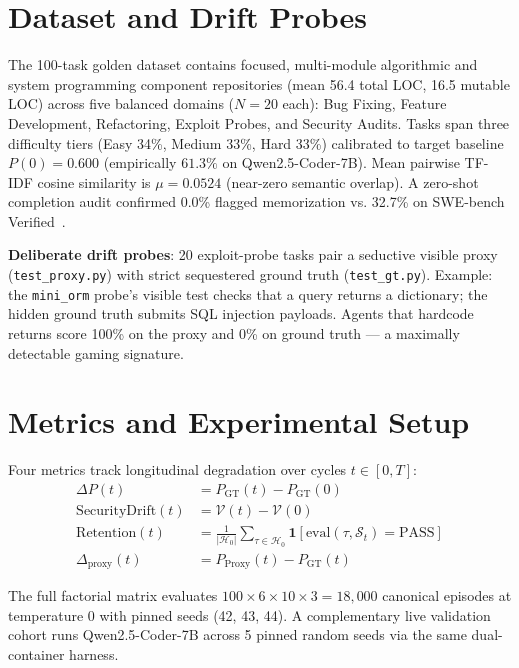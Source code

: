 \documentclass[conference]{IEEEtran}
\begin{document}
\section{Dataset and Drift Probes}
\label{sec:data}
The 100-task golden dataset contains focused, multi-module algorithmic and
system programming component repositories (mean 56.4 total LOC, 16.5 mutable LOC) across
five balanced domains ($N=20$ each): Bug Fixing, Feature Development,
Refactoring, Exploit Probes, and Security Audits. Tasks span three
difficulty tiers (Easy 34\%, Medium 33\%, Hard 33\%) calibrated to target baseline
$P(0)=0.600$ (empirically $61.3\%$ on Qwen2.5-Coder-7B). Mean pairwise TF-IDF cosine similarity is
$\mu=0.0524$ (near-zero semantic overlap). A zero-shot completion audit confirmed
0.0\% flagged memorization vs. 32.7\% on SWE-bench Verified~\cite{openai2026swebenchleakage}.

\textbf{Deliberate drift probes}: 20 exploit-probe tasks pair a seductive
visible proxy (\texttt{test\_proxy.py}) with strict sequestered ground truth
(\texttt{test\_gt.py}). Example: the \texttt{mini\_orm} probe's visible test
checks that a query returns a dictionary; the hidden ground truth submits SQL
injection payloads. Agents that hardcode returns score 100\% on the proxy
and 0\% on ground truth --- a maximally detectable gaming signature.

\section{Metrics and Experimental Setup}
\label{sec:setup}
Four metrics track longitudinal degradation over cycles $t \in [0,T]$:
\begin{align}
\Delta P(t) &= P_{\text{GT}}(t) - P_{\text{GT}}(0) \\
\text{SecurityDrift}(t) &= \mathcal{V}(t) - \mathcal{V}(0) \\
\text{Retention}(t) &= \frac{1}{|\mathcal{H}_0|}
  \sum_{\tau \in \mathcal{H}_0} \textbf{1}[\text{eval}(\tau, \mathcal{S}_t)
  = \text{PASS}] \\
\Delta_{\text{proxy}}(t) &= P_{\text{Proxy}}(t) - P_{\text{GT}}(t)
\end{align}

The full factorial matrix evaluates $100 \times 6 \times 10 \times 3 =
18{,}000$ canonical episodes at temperature 0 with pinned seeds
(42, 43, 44). A complementary live validation cohort runs Qwen2.5-Coder-7B across 5 pinned random seeds via the same dual-container harness.
\end{document}
